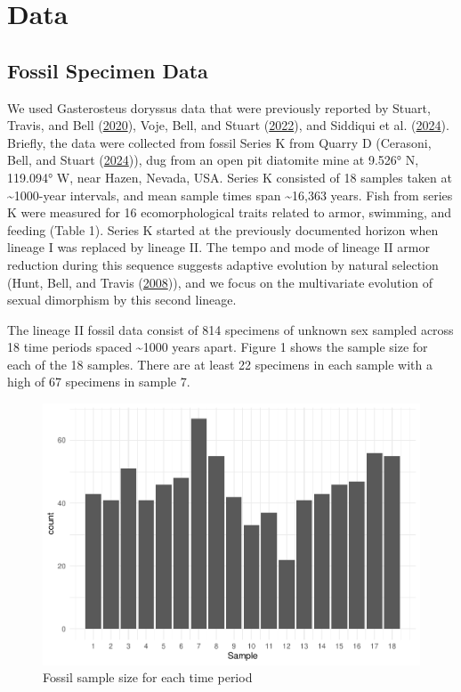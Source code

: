 \documentclass[
  12pt,
]{article}
\begin{document}
\hypertarget{sec:data}{%
\section{Data}\label{sec:data}}

\hypertarget{fossil-specimen-data}{%
\subsection{Fossil Specimen Data}\label{fossil-specimen-data}}

We used Gasterosteus doryssus data that were previously reported by
Stuart, Travis, and Bell (\protect\hyperlink{ref-Stuartetal2020}{2020}),
Voje, Bell, and Stuart (\protect\hyperlink{ref-Vojeetal2022}{2022}), and
Siddiqui et al. (\protect\hyperlink{ref-Siddiquietal2024}{2024}).
Briefly, the data were collected from fossil Series K from Quarry D
(Cerasoni, Bell, and Stuart
(\protect\hyperlink{ref-Cerasonietal2024}{2024})), dug from an open pit
diatomite mine at 9.526° N, 119.094° W, near Hazen, Nevada, USA. Series
K consisted of 18 samples taken at \textasciitilde1000-year intervals,
and mean sample times span \textasciitilde16,363 years. Fish from series
K were measured for 16 ecomorphological traits related to armor,
swimming, and feeding (Table 1). Series K started at the previously
documented horizon when lineage I was replaced by lineage II. The tempo
and mode of lineage II armor reduction during this sequence suggests
adaptive evolution by natural selection (Hunt, Bell, and Travis
(\protect\hyperlink{ref-Huntetal2008}{2008})), and we focus on the
multivariate evolution of sexual dimorphism by this second lineage.

The lineage II fossil data consist of 814 specimens of unknown sex
sampled across 18 time periods spaced \textasciitilde1000 years apart.
Figure 1 shows the sample size for each of the 18 samples. There are at
least 22 specimens in each sample with a high of 67 specimens in sample
7.

\begin{figure}

{\centering \includegraphics{paper_files/figure-latex/unnamed-chunk-2-1} 

}

\caption{Fossil sample size for each time period}\label{fig:unnamed-chunk-2}
\end{figure}
\end{document}
